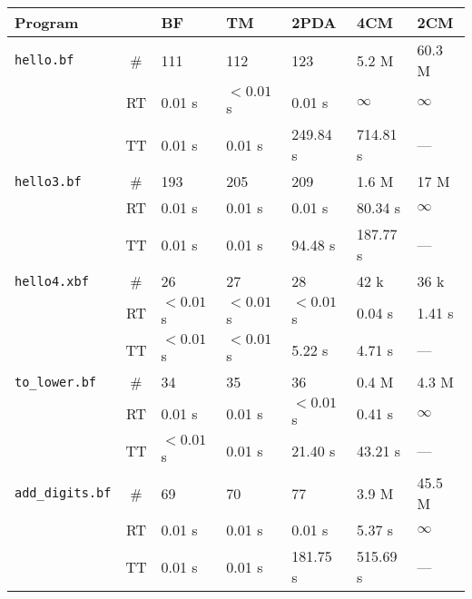 \documentclass[english,shortabstract,mgr]{iithesis}
\begin{document}
\begin{table}[]
\centering
\begin{center}
\begin{tabular}{
  L{2.6cm}c|R{1.7cm}R{1.7cm}R{1.7cm}R{1.7cm}R{1.7cm}
}
\textbf{Program} & & \textbf{BF} & \textbf{TM} & \textbf{2PDA} & \textbf{4CM} & \textbf{2CM} \\
\hline
\texttt{hello.bf} & \# & 111 & 112 & 123 & 5.2 M & 60.3 M\\
 & {\footnotesize{RT}} & 0.01 s & $<0.01$ s & 0.01 s & $\infty$ & $\infty$ \\
 & {\footnotesize{TT}} & 0.01 s & 0.01 s & 249.84 s & 714.81 s & --- \\
\hline
\texttt{hello3.bf} & \# & 193 & 205 & 209 & 1.6 M & 17 M\\
 & {\footnotesize{RT}} & 0.01 s & 0.01 s & 0.01 s & 80.34 s & $\infty$ \\
 & {\footnotesize{TT}} & 0.01 s & 0.01 s & 94.48 s & 187.77 s & --- \\
\hline
\texttt{hello4.xbf} & \# & 26 & 27 & 28 & 42 k & 36 k\\
 & {\footnotesize{RT}} & $<0.01$ s & $<0.01$ s & $<0.01$ s & 0.04 s & 1.41 s \\
 & {\footnotesize{TT}} & $<0.01$ s & $<0.01$ s & 5.22 s & 4.71 s & --- \\
\hline
\texttt{to\_lower.bf} & \# & 34 & 35 & 36 & 0.4 M & 4.3 M\\
 & {\footnotesize{RT}} & 0.01 s & 0.01 s & $<0.01$ s & 0.41 s & $\infty$ \\
 & {\footnotesize{TT}} & $<0.01$ s & 0.01 s & 21.40 s & 43.21 s & --- \\
\hline
\texttt{add\_digits.bf} & \# & 69 & 70 & 77 & 3.9 M & 45.5 M\\
 & {\footnotesize{RT}} & 0.01 s & 0.01 s & 0.01 s & 5.37 s & $\infty$ \\
 & {\footnotesize{TT}} & 0.01 s & 0.01 s & 181.75 s & 515.69 s & --- \\

\end{tabular}
\end{center}
\end{table}
\end{document}
